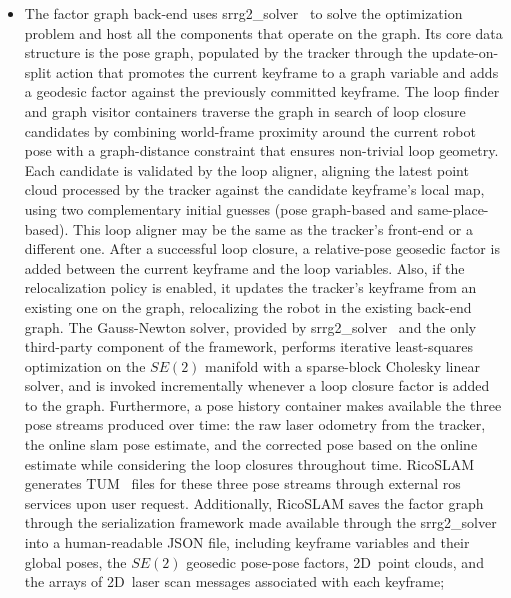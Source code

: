 \begin{itemize}
\item The factor graph back-end uses srrg2\_solver~\cite{grisetti:robotics:2020}
      to solve the optimization problem and host all the components that operate
      on the graph. Its core data structure is the pose graph,
      populated by the tracker through the update-on-split action that
      promotes the current keyframe to a graph variable and adds a geodesic
      factor against the previously committed keyframe.
      The loop finder and graph visitor containers traverse the graph
      in search of loop closure candidates by combining world-frame proximity
      around the current robot pose with a graph-distance constraint that
      ensures non-trivial loop geometry. Each candidate is validated by
      the loop aligner, aligning the latest point cloud processed by the tracker
      against the candidate keyframe's local map, using two complementary
      initial guesses (pose graph-based and same-place-based). This loop aligner
      may be the same as the tracker's front-end or a different one.
      After a successful loop closure, a relative-pose geosedic factor is added
      between the current keyframe and the loop variables. Also, if
      the relocalization policy is enabled, it updates the tracker's keyframe
      from an existing one on the graph, relocalizing the robot in
      the existing back-end graph. The Gauss-Newton solver, provided by
      srrg2\_solver~\cite{grisetti:robotics:2020} and the only third-party
      component of the framework, performs iterative least-squares optimization
      on the $SE(2)$ manifold with a sparse-block Cholesky linear solver,
      and is invoked incrementally whenever a loop closure factor is added to
      the graph. Furthermore, a pose history container makes available the three
      pose streams produced over time: the raw laser odometry from the tracker,
      the online \gls{slam} pose estimate, and the corrected pose based on
      the online estimate while considering the loop closures throughout time.
      RicoSLAM generates TUM~\cite{sturm:iros:2012} files for these three pose
      streams through external \gls{ros} services upon user request.
      Additionally, RicoSLAM saves the factor graph through the serialization
      framework made available through the
      srrg2\_solver~\cite{grisetti:robotics:2020} into a human-readable JSON
      file, including keyframe variables and their global poses,
      the $SE(2)$ geosedic pose-pose factors, 2D~point clouds, and
      the arrays of 2D~laser scan messages associated with each keyframe;


\end{itemize}
